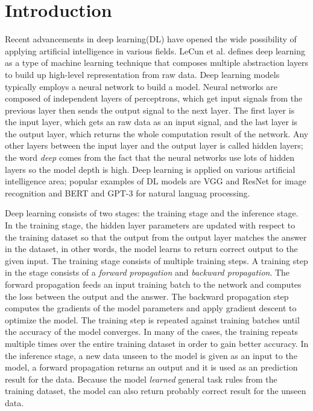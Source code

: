 \section{Introduction}\label{sec:intro}

Recent advancements in deep learning(DL) have opened the wide possibility of
applying artificial intelligence in various fields.
LeCun et al.\cite{LeCun2015} defines deep learning as a
type of machine learning technique that composes multiple
abstraction layers to build up high-level representation from raw data. 
Deep learning models typically employs a neural network to build a model.
Neural networks are composed of independent layers of perceptrons,
which get input signals from the previous layer then sends the
output signal to the next layer.
The first layer is the input layer, which gets an raw data as an input signal,
and the last layer is the output layer, which returns the
whole computation result of the network.
Any other layers between the input layer and the output layer is 
called hidden layers; the word \textit{deep} comes from the fact that
the neural networks use lots of hidden layers so the model depth is high.
Deep learning is applied on various artificial intelligence area;
popular examples of DL models are
VGG\cite{vggnet2014} and ResNet\cite{resnet2015} for image recognition 
and BERT\cite{bert2018} and GPT-3\cite{gpt32020} for natural languag processing.

Deep learning consists of two stages: the training stage and the inference stage.
In the training stage, the hidden layer parameters are updated
with respect to the training dataset so that the output from the output layer
matches the answer in the dataset, in other words, the model learns
to return correct output to the given input. 
The training stage consists of multiple training steps.
A training step in the stage consists of a \textit{forward propagation} and
\textit{backward propagation}.
The forward propagation feeds an input training batch to the
network and computes the loss between the output and the answer.
The backward propagation step computes the gradients of the model parameters
and apply gradient descent to optimize the model.
The training step is repeated against training batches
until the accuracy of the model converges.
In many of the cases, the training repeats multiple times over the entire 
training dataset in order to gain better accuracy.  
In the inference stage, a new data unseen to the model
is given as an input to the model, a forward propagation returns an output
and it is used as an prediction result for the data.
Because the model \textit{learned} general task rules from the training
dataset, the model can also return probably correct result for the
unseen data.


